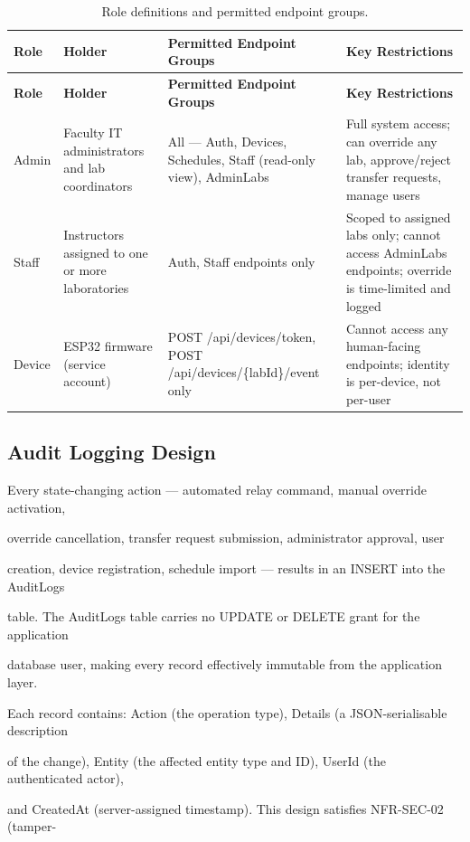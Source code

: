 \begin{longtable}{|L{2.0cm}|L{2.5cm}|L{4.5cm}|L{4.5cm}|}
\caption{Role definitions and permitted endpoint groups.} \label{tab:4-9} \\
\hline
{}
\textbf{Role} & \textbf{Holder} & \textbf{Permitted Endpoint Groups} & \textbf{Key Restrictions} \\
\hline
\endfirsthead
\hline
{}
\textbf{Role} & \textbf{Holder} & \textbf{Permitted Endpoint Groups} & \textbf{Key Restrictions} \\
\hline
\endhead
\hline
\endfoot
\hline
\endlastfoot
Admin & Faculty IT administrators and lab coordinators & All --- Auth, Devices, Schedules, Staff (read-only view), AdminLabs & Full system access; can override any lab, approve/reject transfer requests, manage users \\
\hline
Staff & Instructors assigned to one or more laboratories & Auth, Staff endpoints only & Scoped to assigned labs only; cannot access AdminLabs endpoints; override is time-limited and logged \\
\hline
Device & ESP32 firmware (service account) & POST /api/devices/token, POST /api/devices/\{labId\}/event only & Cannot access any human-facing endpoints; identity is per-device, not per-user \\
\hline
\end{longtable}


\subsection{Audit Logging Design}
Every state-changing action --- automated relay command, manual override activation,

override cancellation, transfer request submission, administrator approval, user

creation, device registration, schedule import --- results in an INSERT into the AuditLogs

table. The AuditLogs table carries no UPDATE or DELETE grant for the application

database user, making every record effectively immutable from the application layer.

Each record contains: Action (the operation type), Details (a JSON-serialisable description

of the change), Entity (the affected entity type and ID), UserId (the authenticated actor),

and CreatedAt (server-assigned timestamp). This design satisﬁes NFR-SEC-02 (tamper-

